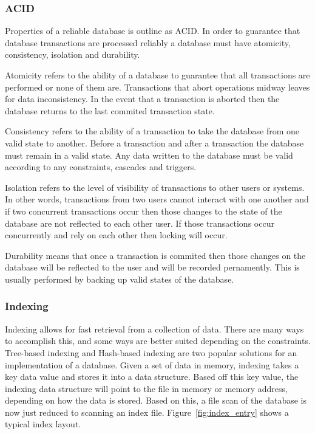 \documentclass[letterpaper, 12pt]{article}
\begin{document}
\subsubsection{ACID}
Properties of a reliable database is outline as ACID. In order to guarantee that
database transactions are processed reliably a database must have atomicity, consistency,
isolation and durability.
\par\vspace{\baselineskip}

Atomicity refers to the ability of a database to guarantee that all transactions
are performed or none of them are. Transactions that abort operations midway leaves
for data inconsistency. In the event that a transaction is aborted then the database
returns to the last commited transaction state.
\par\vspace{\baselineskip}

Consistency refers to the ability of a transaction to take the database from one valid state
to another. Before a transaction and after a transaction the database must remain in a valid state.
Any data written to the database must be valid according to any constraints, cascades and triggers.
\par\vspace{\baselineskip}

Isolation refers to the level of visibility of transactions to other users or systems. In other words,
transactions from two users cannot interact with one another and if two concurrent transactions occur then
those changes to the state of the database are not reflected to each other user. If those transactions occur
concurrently and rely on each other then locking will occur.
\par\vspace{\baselineskip}

Durability means that once a transaction is commited then those changes on the database will be reflected to the user
and will be recorded pernamently. This is usually performed by backing up valid states of the database.
\par\vspace{\baselineskip}

\subsubsection{Indexing}
Indexing allows for fast retrieval from a collection of data. There are many ways to accomplish this,
and some ways are better suited depending on the constraints. Tree-based indexing and Hash-based indexing
are two popular solutions for an implementation of a database. Given a set of data in memory, indexing takes
a key data value and stores it into a data structure. Based off this key value, the indexing data structure
will point to the file in memory or memory address, depending on how the data is stored. Based on this, a
file scan of the database is now just reduced to scanning an index file. Figure~\ref{fig:index_entry} shows
a typical index layout.
\par\vspace{\baselineskip}
\end{document}

